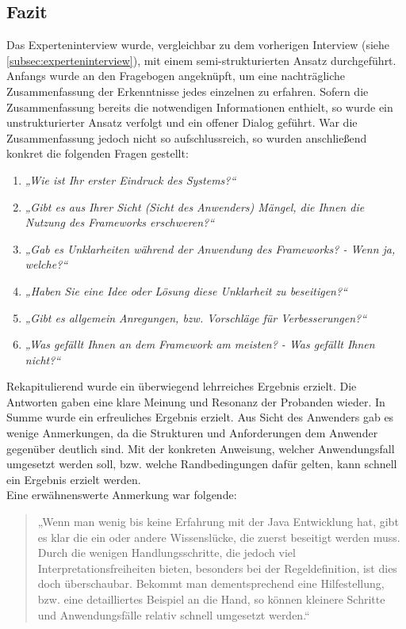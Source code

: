     \subsection{Fazit}
        Das Experteninterview wurde, vergleichbar zu dem vorherigen Interview (siehe \ref{subsec:experteninterview}), mit einem semi-strukturierten Ansatz durchgeführt. 
        Anfangs wurde an den Fragebogen angeknüpft, um eine nachträgliche Zusammenfassung der Erkenntnisse jedes einzelnen zu erfahren. Sofern die Zusammenfassung bereits 
        die notwendigen Informationen enthielt, so wurde ein unstrukturierter Ansatz verfolgt und ein offener Dialog geführt. War die Zusammenfassung jedoch nicht 
        so aufschlussreich, so wurden anschließend konkret die 
        folgenden Fragen gestellt: 
        \begin{enumerate}
            \item \textit{„Wie ist Ihr erster Eindruck des Systems?“}
            \item \textit{„Gibt es aus Ihrer Sicht (Sicht des Anwenders) Mängel, die Ihnen die Nutzung des Frameworks erschweren?“}
            \item \textit{„Gab es Unklarheiten während der Anwendung des Frameworks? - Wenn ja, welche?“}
            \item \textit{„Haben Sie eine Idee oder Lösung diese Unklarheit zu beseitigen?“}
            \item \textit{„Gibt es allgemein Anregungen, bzw. Vorschläge für Verbesserungen?“}
            \item \textit{„Was gefällt Ihnen an dem Framework am meisten? - Was gefällt Ihnen nicht?“}
        \end{enumerate} 
        Rekapitulierend wurde ein überwiegend lehrreiches Ergebnis erzielt. Die Antworten gaben eine klare Meinung und Resonanz der Probanden wieder. 
        In Summe wurde ein erfreuliches Ergebnis erzielt. Aus Sicht des Anwenders gab es wenige Anmerkungen, da die Strukturen und Anforderungen dem Anwender 
        gegenüber deutlich sind. Mit der konkreten Anweisung, welcher Anwendungsfall umgesetzt werden soll, bzw. welche Randbedingungen dafür gelten, kann 
        schnell ein Ergebnis erzielt werden. 
        \\
        Eine erwähnenswerte Anmerkung war folgende:
        \begin{quote}
            „Wenn man wenig bis keine Erfahrung mit der Java Entwicklung hat, gibt es klar die ein oder andere Wissenslücke, die zuerst beseitigt werden muss. 
            Durch die wenigen Handlungsschritte, die jedoch viel Interpretationsfreiheiten bieten, besonders bei der Regeldefinition, ist dies doch überschaubar. 
            Bekommt man dementsprechend eine Hilfestellung, bzw. eine detailliertes Beispiel an die Hand, so können kleinere Schritte und Anwendungsfälle 
            relativ schnell umgesetzt werden.“
        \end{quote}
